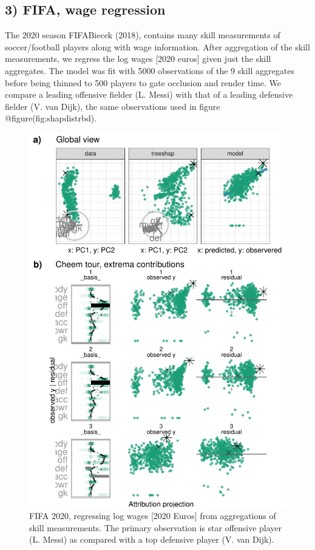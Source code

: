 \documentclass[
]{article}
\begin{document}
\hypertarget{fifa-wage-regression}{%
\subsection{3) FIFA, wage regression}\label{fifa-wage-regression}}

The 2020 season FIFABiecek (2018), contains many skill measurements of soccer/football players along with wage information. After aggregation of the skill measurements, we regress the log wages {[}2020 euros{]} given just the skill aggregates. The model was fit with 5000 observations of the 9 skill aggregates before being thinned to 500 players to gate occlusion and render time. We compare a leading offensive fielder (L. Messi) with that of a leading defensive fielder (V. van Dijk), the same observations used in figure @figure(fig:shapdistrbd).

\begin{figure}

{\centering \includegraphics[width=1\linewidth]{./figures/case_fifa} 

}

\caption{FIFA 2020, regressing log wages [2020 Euros] from aggregations of skill measurements. The primary observation is star offensive player (L. Messi) as compared with a top defensive player (V. van Dijk).}\label{fig:casefifa}
\end{figure}
\end{document}
